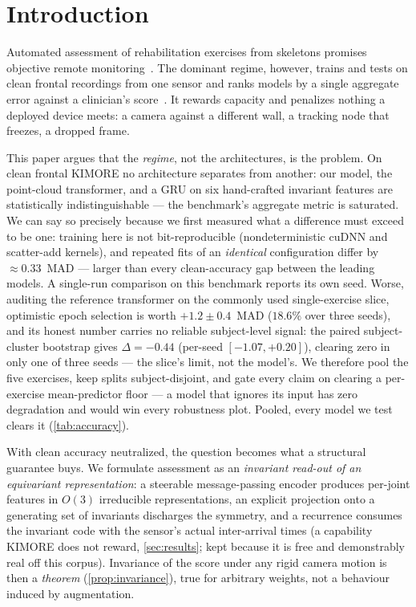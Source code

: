 \documentclass[10pt,twocolumn,letterpaper]{article}
\begin{document}
\section{Introduction}\label{sec:intro}
Automated assessment of rehabilitation exercises from skeletons promises objective remote
monitoring~\cite{capecci2019kimore}. The dominant regime, however, trains and tests on clean frontal
recordings from one sensor and ranks models by a single aggregate error against a clinician's
score~\cite{karlov2024,abedi2023,kuang2026,pct2026}. It rewards capacity and penalizes nothing a
deployed device meets: a camera against a different wall, a tracking node that freezes, a dropped frame.

This paper argues that the \emph{regime}, not the architectures, is the problem. On clean frontal KIMORE
no architecture separates from another: our model, the point-cloud transformer, and a GRU on six
hand-crafted invariant features are statistically indistinguishable --- the benchmark's aggregate metric
is saturated. We can say so precisely because we first measured what a difference
must exceed to be one: training here is not bit-reproducible (nondeterministic cuDNN and scatter-add
kernels), and repeated fits of an \emph{identical} configuration differ by $\approx\!0.33$~MAD ---
larger than every clean-accuracy gap between the leading models. A single-run comparison on this
benchmark reports its own seed. Worse, auditing the reference transformer on the commonly used
single-exercise slice, optimistic epoch selection is worth $+1.2\pm0.4$~MAD ($18.6\%$ over three
seeds), and its honest number carries no reliable subject-level signal: the paired subject-cluster
bootstrap gives $\Delta=-0.44$ (per-seed $[-1.07,+0.20]$), clearing zero in only one of three seeds ---
the slice's limit, not the model's. We therefore
pool the five exercises, keep splits subject-disjoint, and gate every claim on clearing a per-exercise
mean-predictor floor --- a model that ignores its input has zero degradation and would win every
robustness plot. Pooled, every model we test clears it (\cref{tab:accuracy}).

With clean accuracy neutralized, the question becomes what a structural guarantee buys. We formulate
assessment as an \emph{invariant read-out of an equivariant representation}: a steerable
message-passing encoder produces per-joint features in $O(3)$ irreducible representations, an explicit
projection onto a generating set of invariants discharges the symmetry, and a recurrence consumes the
invariant code with the sensor's actual inter-arrival times (a capability KIMORE does not reward,
\cref{sec:results}; kept because it is free and demonstrably real off this corpus). Invariance of the score under any rigid
camera motion is then a \emph{theorem} (\cref{prop:invariance}), true for arbitrary weights, not a
behaviour induced by augmentation.
\end{document}
